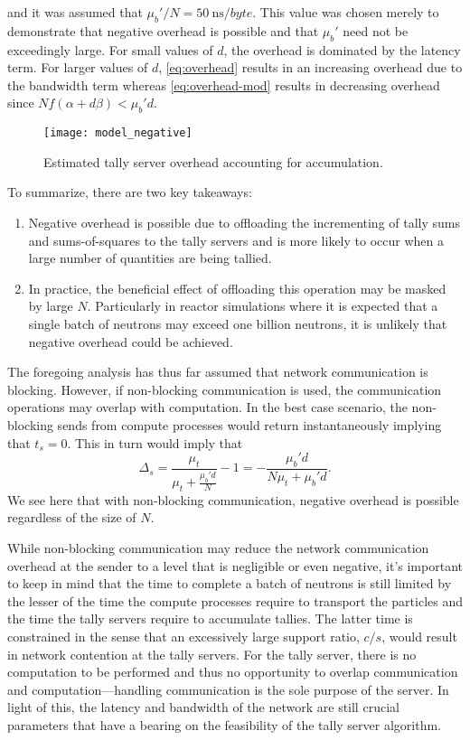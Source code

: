 \documentclass{snamc2013}
\begin{document}
and it was assumed that $\mu_b'/N = \SI{50}{\nano\second/byte}$. This value was
chosen merely to demonstrate that negative overhead is possible and that
$\mu_b'$ need not be exceedingly large. For small values of $d$, the overhead is
dominated by the latency term. For larger values of $d$, \autoref{eq:overhead}
results in an increasing overhead due to the bandwidth term whereas
\autoref{eq:overhead-mod} results in decreasing overhead since $Nf (\alpha +
d\beta) < \mu_b' d$.
\begin{figure}[htb]
  \centering
  \texttt{[image: model\_negative]}
  \caption{Estimated tally server overhead accounting for accumulation.}
  \label{fig:model-negative}
\end{figure}

To summarize, there are two key takeaways:
\begin{enumerate}
\item Negative overhead is possible due to offloading the incrementing of tally
  sums and sums-of-squares to the tally servers and is more likely to occur when
  a large number of quantities are being tallied.
\item In practice, the beneficial effect of offloading this operation may be
  masked by large $N$. Particularly in reactor simulations where it is expected
  that a single batch of neutrons may exceed one billion neutrons, it is
  unlikely that negative overhead could be achieved.
\end{enumerate}

The foregoing analysis has thus far assumed that network communication is
blocking. However, if non-blocking communication is used, the communication
operations may overlap with computation. In the best case scenario, the
non-blocking sends from compute processes would return instantaneously implying
that $t_s = 0$. This in turn would imply that
\begin{equation}
  \label{eq:overhead-nb}
  \Delta_s = \frac{\mu_t}{\mu_t + \frac{\mu_b' d}{N}} - 1 = -\frac{\mu_b'
    d}{N\mu_t + \mu_b' d}.
\end{equation}
We see here that with non-blocking communication, negative overhead is possible
regardless of the size of $N$.

While non-blocking communication may reduce the network communication overhead
at the sender to a level that is negligible or even negative, it's important to
keep in mind that the time to complete a batch of neutrons is still limited by
the lesser of the time the compute processes require to transport the particles
and the time the tally servers require to accumulate tallies. The latter time is
constrained in the sense that an excessively large support ratio, $c/s$, would
result in network contention at the tally servers. For the tally server, there
is no computation to be performed and thus no opportunity to overlap
communication and computation---handling communication is the sole purpose of
the server. In light of this, the latency and bandwidth of the network are still
crucial parameters that have a bearing on the feasibility of the tally server
algorithm.
\end{document}
